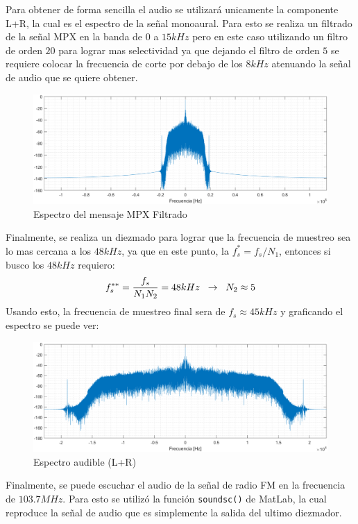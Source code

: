 Para obtener de forma sencilla el audio se utilizará unicamente la componente L+R, la cual es el espectro de la señal monoaural. Para esto se realiza un filtrado de la señal MPX en la banda de $0$ a $15kHz$ pero en este caso utilizando un filtro de orden $20$ para lograr mas selectividad ya que dejando el filtro de orden $5$ se requiere colocar la frecuencia de corte por debajo de los $8kHz$ atenuando la señal de audio que se quiere obtener.
\begin{figure}[H]
    \centering
    \includegraphics[width=\columnwidth]{images/2.5-mpx-filtrado.png}
    \caption{Espectro del mensaje MPX Filtrado}
    \label{fig:imagen8}
\end{figure}
Finalmente, se realiza un diezmado para lograr que la frecuencia de muestreo sea lo mas cercana a los $48kHz$, ya que en este punto, la $f^{*}_{s}=f_{s}/N_{1}$, entonces si busco los $48kHz$ requiero:
$$
f^{**}_{s} = \frac{f_{s}}{N_{1} N_{2}} = 48kHz
\hspace{2mm}\to\hspace{2mm}
N_{2} \approx 5
$$
Usando esto, la frecuencia de muestreo final sera de $f_{s} \approx 45kHz$ y graficando el espectro se puede ver:
\begin{figure}[H]
    \centering
    \includegraphics[width=\columnwidth]{images/2.6-mpx-final.png}
    \caption{Espectro audible (L+R)}
    \label{fig:imagen9}
\end{figure}
Finalmente, se puede escuchar el audio de la señal de radio FM en la frecuencia de $103.7 MHz$. Para esto se utilizó la función \texttt{soundsc()} de MatLab, la cual reproduce la señal de audio que es simplemente la salida del ultimo diezmador.



\hspace{1cm}